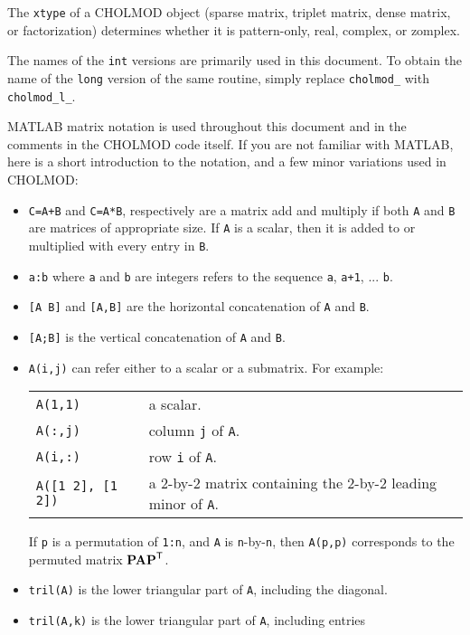 \documentclass[11pt]{article}
\newcommand{\m}[1]{{\bf{#1}}}       %
\newcommand{\tr}{^{\sf T}}          %
\begin{document}
The {\tt xtype} of a CHOLMOD object (sparse matrix, triplet matrix, dense
matrix, or factorization) determines whether it is pattern-only,
real, complex, or zomplex.

The names of the {\tt int} versions are primarily used in this document.
To obtain the name of the {\tt long} version of the same routine, simply
replace {\tt cholmod\_} with {\tt cholmod\_l\_}.

MATLAB matrix notation is used throughout this document and in
the comments in the CHOLMOD code itself.  If you are not familiar with
MATLAB, here is a short introduction to the notation, and a few
minor variations used in CHOLMOD:

\begin{itemize}
    \item {\tt C=A+B} and {\tt C=A*B}, respectively are a matrix add and multiply if both
	{\tt A} and {\tt B} are matrices of appropriate size.  If {\tt A} is
	a scalar, then it is added to or multiplied with every entry in {\tt B}.
    \item {\tt a:b} where {\tt a} and {\tt b} are integers refers to the
	sequence {\tt a}, {\tt a+1}, ... {\tt b}.
    \item {\tt [A B]} and {\tt [A,B]} are the horizontal concatenation of {\tt A} and {\tt B}.
    \item {\tt [A;B]} is the vertical concatenation of {\tt A} and {\tt B}.
    \item {\tt A(i,j)} can refer either to a scalar or a submatrix.
	For example: \newline
	\vspace{0.05in}
	\begin{tabular}{ll}
	\hline
	{\tt A(1,1)} & a scalar. \\
	{\tt A(:,j)} & column {\tt j} of {\tt A}. \\
	{\tt A(i,:)} & row {\tt i} of {\tt A}. \\
	{\tt A([1 2], [1 2])} & a 2-by-2 matrix containing the 2-by-2 leading minor of {\tt A}. \\
	\hline
	\end{tabular} \newline
	\vspace{0.1in}
	If {\tt p} is a permutation of {\tt 1:n}, and {\tt A} is {\tt n}-by-{\tt n},
	then {\tt A(p,p)} corresponds to the permuted matrix $\m{PAP}\tr$.
    \item {\tt tril(A)} is the lower triangular part of {\tt A}, including the diagonal.
    \item {\tt tril(A,k)} is the lower triangular part of {\tt A}, including entries

\end{itemize}
\end{document}
